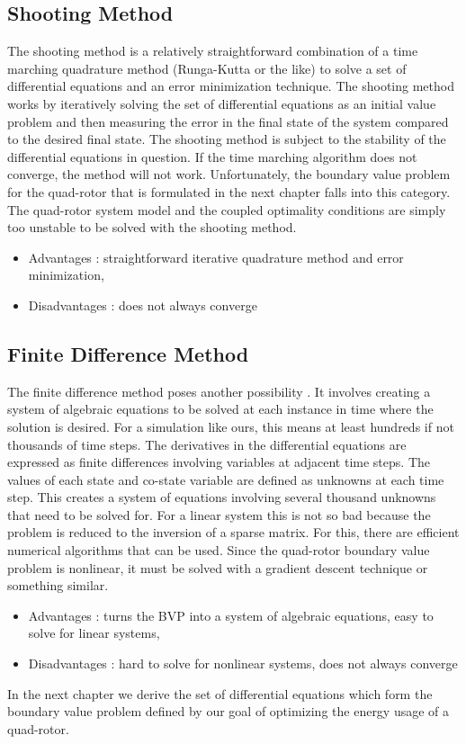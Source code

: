 \subsection{Shooting Method}

The shooting method is a relatively straightforward combination of a time marching quadrature method (Runga-Kutta or the like) to solve a set of differential equations and an error minimization technique. The shooting method works by iteratively solving the set of differential equations as an initial value problem and then measuring the error in the final state of the system compared to the desired final state. The shooting method is subject to the stability of the differential equations in question. If the time marching algorithm does not converge, the method will not work. Unfortunately, the boundary value problem for the quad-rotor that is formulated in the next chapter falls into this category. The quad-rotor system model and the coupled optimality conditions are simply too unstable to be solved with the shooting method.
\begin{itemize}
\item Advantages : straightforward iterative quadrature method and error minimization,
\item Disadvantages : does not always converge
\end{itemize}

\subsection{Finite Difference Method}

The finite difference method poses another possibility \cite{rao2001applied}. It involves creating a system of algebraic equations to be solved at each instance in time where the solution is desired. For a simulation like ours, this means at least hundreds if not thousands of time steps. The derivatives in the differential equations are expressed as finite differences involving variables at adjacent time steps. The values of each state and co-state variable are defined as unknowns at each time step. This creates a system of equations involving several thousand unknowns that need to be solved for. For a linear system this is not so bad because the problem is reduced to the inversion of a sparse matrix. For this, there are efficient numerical algorithms that can be used. Since the quad-rotor boundary value problem is nonlinear, it must be solved with a gradient descent technique or something similar.
\begin{itemize}
\item Advantages : turns the BVP into a system of algebraic equations, easy to solve for linear systems,
\item Disadvantages : hard to solve for nonlinear systems, does not always converge
\end{itemize}

In the next chapter we derive the set of differential equations which form the boundary value problem defined by our goal of optimizing the energy usage of a quad-rotor.




